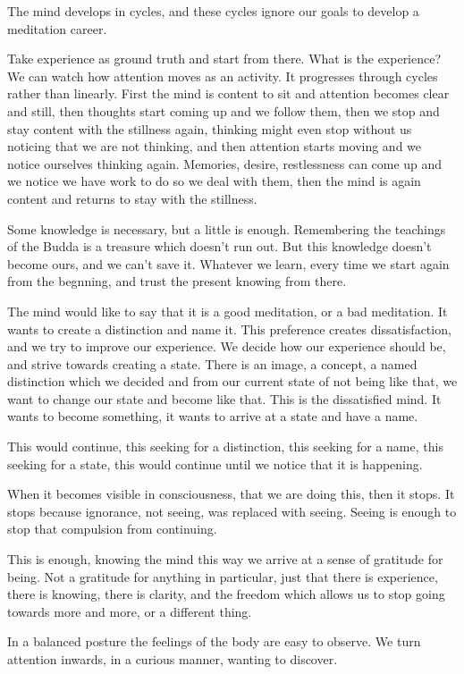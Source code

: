 The mind develops in cycles, and these cycles ignore our goals to
develop a meditation career.

Take experience as ground truth and start from there. What is the
experience? We can watch how attention moves as an activity. It
progresses through cycles rather than linearly. First the mind is
content to sit and attention becomes clear and still, then thoughts
start coming up and we follow them, then we stop and stay content with
the stillness again, thinking might even stop without us noticing that
we are not thinking, and then attention starts moving and we notice
ourselves thinking again. Memories, desire, restlessness can come up and
we notice we have work to do so we deal with them, then the mind is
again content and returns to stay with the stillness.

Some knowledge is necessary, but a little is enough. Remembering the
teachings of the Budda is a treasure which doesn't run out. But this
knowledge doesn't become ours, and we can't save it. Whatever we learn,
every time we start again from the begnning, and trust the present
knowing from there.

The mind would like to say that it is a good meditation, or a bad
meditation. It wants to create a distinction and name it. This
preference creates dissatisfaction, and we try to improve our
experience. We decide how our experience should be, and strive towards
creating a state. There is an image, a concept, a named distinction
which we decided and from our current state of not being like that, we
want to change our state and become like that. This is the dissatisfied
mind. It wants to become something, it wants to arrive at a state and
have a name.

This would continue, this seeking for a distinction, this seeking for a
name, this seeking for a state, this would continue until we notice that
it is happening.

When it becomes visible in consciousness, that we are doing this, then
it stops. It stops because ignorance, not seeing, was replaced with
seeing. Seeing is enough to stop that compulsion from continuing.

This is enough, knowing the mind this way we arrive at a sense of
gratitude for being. Not a gratitude for anything in particular, just
that there is experience, there is knowing, there is clarity, and the
freedom which allows us to stop going towards more and more, or a
different thing.

In a balanced posture the feelings of the body are easy to observe. We
turn attention inwards, in a curious manner, wanting to discover.

